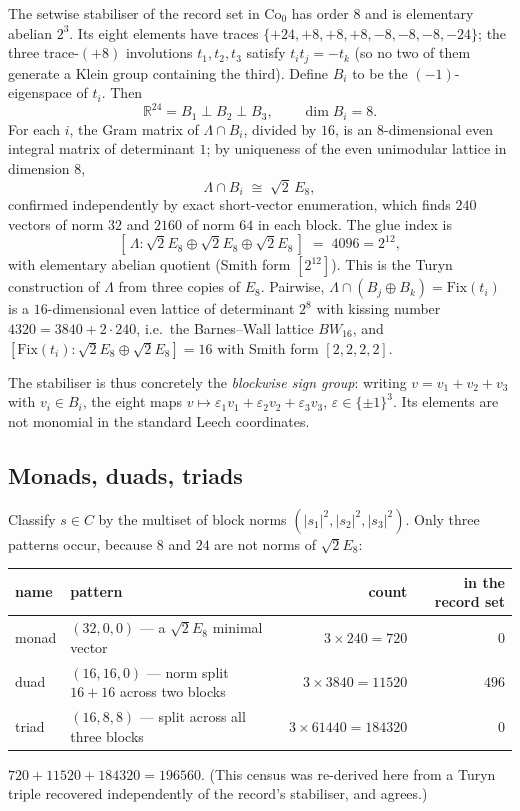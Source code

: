 \documentclass[10pt,a4paper]{article}
\newcommand{\Lam}{\Lambda}
\newcommand{\Co}{\mathrm{Co}_0}
\begin{document}
The setwise stabiliser of the record set in $\Co$ has order $8$ and is elementary abelian $2^3$.
Its eight elements have traces $\{+24, +8, +8, +8, -8, -8, -8, -24\}$; the three trace-$(+8)$
involutions $t_1, t_2, t_3$ satisfy $t_i t_j = -t_k$ (so no two of them generate a Klein group
containing the third). Define $B_i$ to be the $(-1)$-eigenspace of $t_i$. Then
\[
  \mathbb{R}^{24} = B_1 \perp B_2 \perp B_3, \qquad \dim B_i = 8 .
\]
For each $i$, the Gram matrix of $\Lam \cap B_i$, divided by $16$, is an $8$-dimensional even
integral matrix of determinant $1$; by uniqueness of the even unimodular lattice in dimension $8$,
\[
  \Lam \cap B_i \;\cong\; \sqrt{2}\,E_8 ,
\]
confirmed independently by exact short-vector enumeration, which finds $240$ vectors of norm $32$
and $2160$ of norm $64$ in each block. The glue index is
\[
  [\,\Lam : \sqrt2 E_8 \oplus \sqrt2 E_8 \oplus \sqrt2 E_8\,] \;=\; 4096 = 2^{12},
\]
with elementary abelian quotient (Smith form $[2^{12}]$). This is the Turyn construction of $\Lam$
from three copies of $E_8$. Pairwise, $\Lam \cap (B_j \oplus B_k) = \mathrm{Fix}(t_i)$ is a
$16$-dimensional even lattice of determinant $2^8$ with kissing number
$4320 = 3840 + 2\cdot 240$, i.e.\ the Barnes--Wall lattice $BW_{16}$, and
$[\mathrm{Fix}(t_i) : \sqrt2E_8 \oplus \sqrt2E_8] = 16$ with Smith form $[2,2,2,2]$.

The stabiliser is thus concretely the \emph{blockwise sign group}: writing $v = v_1 + v_2 + v_3$ with
$v_i \in B_i$, the eight maps $v \mapsto \varepsilon_1v_1 + \varepsilon_2v_2 + \varepsilon_3v_3$,
$\varepsilon \in \{\pm 1\}^3$. Its elements are not monomial in the standard Leech coordinates.

\subsection{Monads, duads, triads}

Classify $s \in C$ by the multiset of block norms $(|s_1|^2, |s_2|^2, |s_3|^2)$. Only three patterns
occur, because $8$ and $24$ are not norms of $\sqrt2E_8$:

\begin{center}
\small
\begin{tabular}{@{}llrr@{}}
\toprule
name & pattern & count & in the record set \\
\midrule
monad & $(32,0,0)$ --- a $\sqrt2E_8$ minimal vector & $3 \times 240 = 720$ & $0$ \\
duad & $(16,16,0)$ --- norm split $16+16$ across two blocks & $3 \times 3840 = 11520$ & $496$ \\
triad & $(16,8,8)$ --- split across all three blocks & $3 \times 61440 = 184320$ & $0$ \\
\bottomrule
\end{tabular}
\end{center}
$720 + 11520 + 184320 = 196560$. (This census was re-derived here from a Turyn triple recovered
independently of the record's stabiliser, and agrees.)
\end{document}
